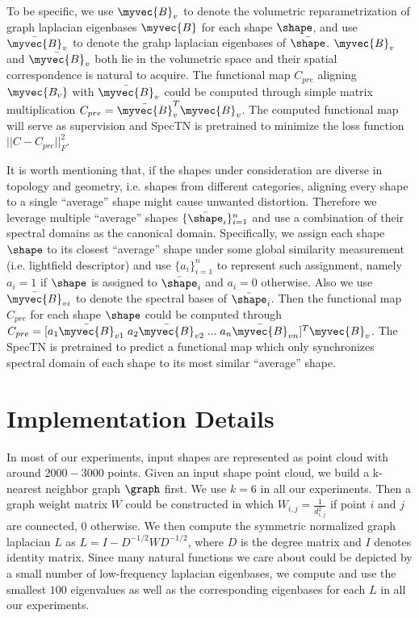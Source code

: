 To be specific, we use $\myvec{B}_v$ to denote the volumetric reparametrization of graph laplacian eigenbases $\myvec{B}$ for each shape $\shape$, and use $\bar{\myvec{B}}_v$ to denote the grahp laplacian eigenbases of $\bar{\shape}$. $\myvec{B}_v$ and $\bar{\myvec{B}}_v$ both lie in the volumetric space and their spatial correspondence is natural to acquire. The functional map $C_{pre}$ aligning $\myvec{B_v}$ with $\bar{\myvec{B}}_v$ could be computed through simple matrix multiplication $C_{pre}=\bar{\myvec{B}}_v^T\myvec{B}_v$. The computed functional map will serve as supervision and SpecTN is pretrained to minimize the loss function $||C-C_{pre}||_F^2$.

It is worth mentioning that, if the shapes under consideration are diverse in topology and geometry, i.e. shapes from different categories, aligning every shape to a single ``average'' shape might cause unwanted distortion. Therefore we leverage multiple ``average'' shapes $\{\bar{\shape}_i\}_{i=1}^{n}$ and use a combination of their spectral domains as the canonical domain. Specifically, we assign each shape $\shape$ to its closest ``average'' shape under some global similarity measurement (i.e. lightfield descriptor) and use $\{a_i\}_{i=1}^n$ to represent such assignment, namely $a_i=1$ if $\shape$ is assigned to $\bar{\shape}_i$ and $a_i=0$ otherwise. Also we use $\bar{\myvec{B}}_{vi}$ to denote the spectral bases of $\bar{\shape}_i$. Then the functional map $C_{pre}$ for each shape $\shape$ could be computed through $C_{pre}=[a_1\bar{\myvec{B}}_{v1} \;a_2\bar{\myvec{B}}_{v2}\; ...\; a_n\bar{\myvec{B}}_{vn}]^T\myvec{B}_v$. The SpecTN is pretrained to predict a functional map which only synchronizes spectral domain of each shape to its most similar ``average'' shape.

\section{Implementation Details}
\label{sec:impl}
In most of our experiments, input shapes are represented as point cloud with around $2000-3000$ points. Given an input shape point cloud, we build a k-nearest neighbor graph $\graph$ first. We use $k=6$ in all our experiments. Then a graph weight matrix $W$ could be constructed in which $W_{i,j}=\frac{1}{d_{i,j}^2}$ if point $i$ and $j$ are connected, $0$ otherwise. We then compute the symmetric normalized graph laplacian $L$ as $L=I-D^{-1/2}WD^{-1/2}$, where $D$ is the degree matrix and $I$ denotes identity matrix. Since many natural functions we care about could be depicted by a small number of low-frequency laplacian eigenbases, we compute and use the smallest $100$ eigenvalues as well as the corresponding eigenbases for each $L$ in all our experiments. 

